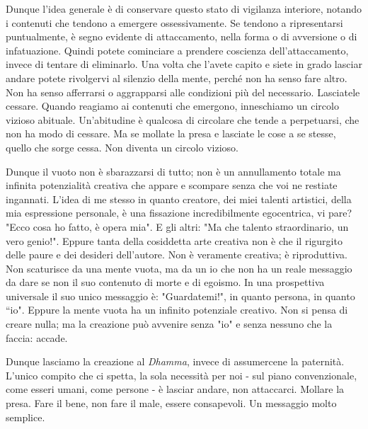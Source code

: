 Dunque l'idea generale è di conservare questo stato di vigilanza
interiore, notando i contenuti che tendono a emergere ossessivamente. Se
tendono a ripresentarsi puntualmente, è segno evidente di attaccamento,
nella forma o di avversione o di infatuazione. Quindi potete cominciare
a prendere coscienza dell'attaccamento, invece di tentare di eliminarlo.
Una volta che l'avete capito e siete in grado lasciar andare potete
rivolgervi al silenzio della mente, perché non ha senso fare altro. Non
ha senso afferrarsi o aggrapparsi alle condizioni più del necessario.
Lasciatele cessare. Quando reagiamo ai contenuti che emergono,
inneschiamo un circolo vizioso abituale. Un'abitudine è qualcosa di
circolare che tende a perpetuarsi, che non ha modo di cessare. Ma se
mollate la presa e lasciate le cose a se stesse, quello che sorge cessa.
Non diventa un circolo vizioso.

Dunque il vuoto non è sbarazzarsi di tutto; non è un annullamento totale
ma infinita potenzialità creativa che appare e scompare senza che voi ne
restiate ingannati. L'idea di me stesso in quanto creatore, dei miei
talenti artistici, della mia espressione personale, è una fissazione
incredibilmente egocentrica, vi pare? "Ecco cosa ho fatto, è opera mia".
E gli altri: "Ma che talento straordinario, un vero genio!". Eppure
tanta della cosiddetta arte creativa non è che il rigurgito delle paure
e dei desideri dell'autore. Non è veramente creativa; è riproduttiva.
Non scaturisce da una mente vuota, ma da un io che non ha un reale
messaggio da dare se non il suo contenuto di morte e di egoismo. In una
prospettiva universale il suo unico messaggio è: "Guardatemi!", in
quanto persona, in quanto “io". Eppure la mente vuota ha un infinito
potenziale creativo. Non si pensa di creare nulla; ma la creazione può
avvenire senza "io" e senza nessuno che la faccia: accade.

Dunque lasciamo la creazione al \textit{Dhamma}, invece di assumercene la
paternità. L'unico compito che ci spetta, la sola necessità per noi -
sul piano convenzionale, come esseri umani, come persone - è lasciar
andare, non attaccarci. Mollare la presa. Fare il bene, non fare il
male, essere consapevoli. Un messaggio molto semplice.


